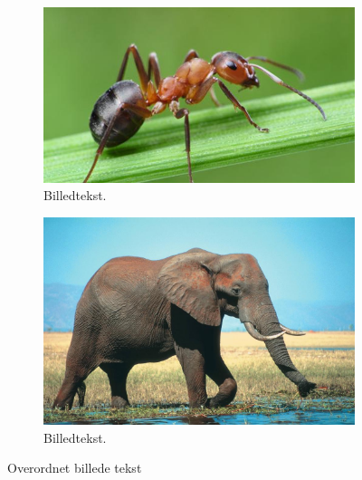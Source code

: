 \documentclass{article}
\begin{document}
\begin{figure}[H]
  \begin{subfigure}[b]{0.5\textwidth}
    \includegraphics[width=\textwidth]{figures/myre} %
    \caption{Billedtekst. \cite{myre}} %
    \label{fig:myre} %
  \end{subfigure}
  \hfill
  \begin{subfigure}[b]{0.5\textwidth}
    \includegraphics[width=\textwidth]{figures/elefant} %
    \caption{Billedtekst. \cite{elefant}} %
    \label{fig:elefant} %
  \end{subfigure}
  \caption{Overordnet billede tekst\cite{myre_elefant}} %
\end{figure}
\end{document}
